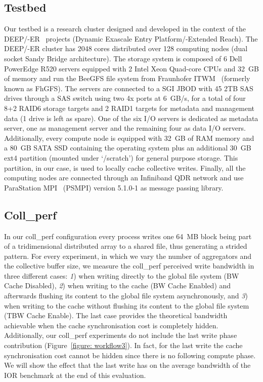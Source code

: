 \subsection{Testbed}
\label{subsec: testbed}
Our testbed is a research cluster designed and developed in the context of the DEEP/-ER~\cite{deep}\cite{deep-er} projects (Dynamic Exascale Entry Platform/-Extended Reach). The DEEP/-ER cluster has 2048 cores distributed over 128 computing nodes (dual socket Sandy Bridge architecture). The storage system is composed of 6 Dell PowerEdge R520 servers equipped with 2 Intel Xeon Quad-core CPUs and 32~GB of memory and run the BeeGFS file system from Fraunhofer ITWM~\cite{fhgfs} (formerly known as FhGFS). The servers are connected to a SGI JBOD with 45 2TB SAS drives through a SAS switch using two 4x ports at 6~GB/s, for a total of four 8+2 RAID6 storage targets and 2 RAID1 targets for metadata and management data (1 drive is left as spare). One of the six I/O servers is dedicated as metadata server, one as management server and the remaining four as data I/O servers.
Additionally, every compute node is equipped with 32~GB of RAM memory and a 80~GB SATA SSD containing the operating system plus an additional 30~GB ext4 partition (mounted under `/scratch') for general purpose storage. This partition, in our case, is used to locally cache collective writes. Finally, all the computing nodes are connected through an Infiniband QDR network and use ParaStation MPI~\cite{parastation} (PSMPI) version 5.1.0-1 as message passing library.

\subsection{Coll\_perf}
\label{subsec: coll_perf}
In our coll\_perf configuration every process writes one 64~MB block being part of a tridimensional distributed array to a shared file, thus generating a strided pattern. For every experiment, in which we vary the number of aggregators and the collective buffer size, we measure the coll\_perf perceived write bandwidth in three different cases: \textit{1}) when writing directly to the global file system (BW Cache Disabled), \textit{2}) when writing to the cache (BW Cache Enabled) and afterwards flushing its content to the global file system asynchronously, and \textit{3}) when writing to the cache without flushing its content to the global file system (TBW Cache Enable). The last case provides the theoretical bandwidth achievable when the cache synchronisation cost is completely hidden. Additionally, our coll\_perf experiments do not include the last write phase contribution (Figure~\ref{figure: workflow3}). In fact, for the last write the cache synchronisation cost cannot be hidden since there is no following compute phase. We will show the effect that the last write has on the average bandwidth of the IOR benchmark at the end of this evaluation.

